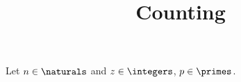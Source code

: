 \documentclass[final]{dmtcs-episciences}
\title{Counting}
\begin{document}
\maketitle
Let $n\in\naturals$ and $z\in\integers$, $p\in\primes$.
\end{document}
